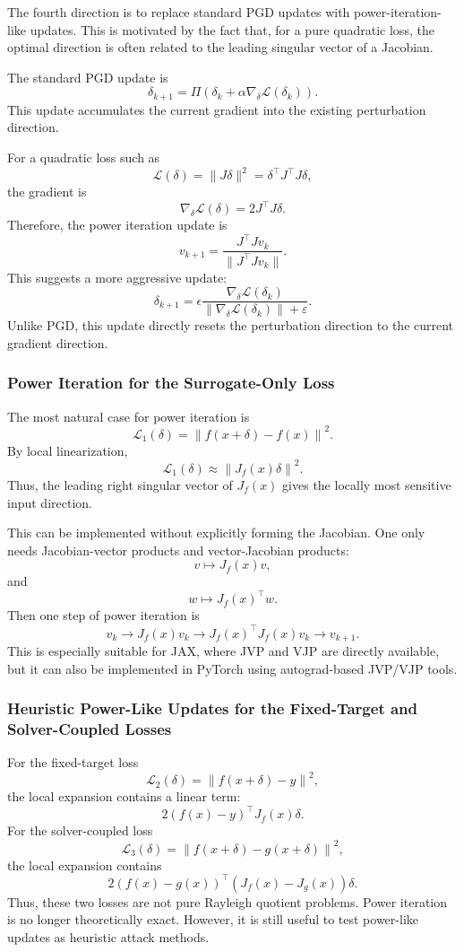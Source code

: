 \documentclass{article}
\begin{document}
The fourth direction is to replace standard PGD updates with power-iteration-like updates. This is motivated by the fact that, for a pure quadratic loss, the optimal direction is often related to the leading singular vector of a Jacobian.

The standard PGD update is
\[
\delta_{k+1}
=
\Pi
\left(
\delta_k
+
\alpha \nabla_\delta \mathcal{L}(\delta_k)
\right).
\]
This update accumulates the current gradient into the existing perturbation direction.

For a quadratic loss such as
\[
\mathcal{L}(\delta)
=
\|J\delta\|^2
=
\delta^\top J^\top J\delta,
\]
the gradient is
\[
\nabla_\delta \mathcal{L}(\delta)
=
2J^\top J\delta.
\]
Therefore, the power iteration update is
\[
v_{k+1}
=
\frac{
J^\top Jv_k
}{
\|J^\top Jv_k\|
}.
\]
This suggests a more aggressive update:
\[
\delta_{k+1}
=
\epsilon
\frac{
\nabla_\delta \mathcal{L}(\delta_k)
}{
\|\nabla_\delta \mathcal{L}(\delta_k)\|+\varepsilon
}.
\]
Unlike PGD, this update directly resets the perturbation direction to the current gradient direction.

\subsubsection{Power Iteration for the Surrogate-Only Loss}

The most natural case for power iteration is
\[
\mathcal{L}_1(\delta)
=
\left\|
f(x+\delta)-f(x)
\right\|^2.
\]
By local linearization,
\[
\mathcal{L}_1(\delta)
\approx
\left\|
J_f(x)\delta
\right\|^2.
\]
Thus, the leading right singular vector of \(J_f(x)\) gives the locally most sensitive input direction.

This can be implemented without explicitly forming the Jacobian. One only needs Jacobian-vector products and vector-Jacobian products:
\[
v
\mapsto
J_f(x)v,
\]
and
\[
w
\mapsto
J_f(x)^\top w.
\]
Then one step of power iteration is
\[
v_k
\rightarrow
J_f(x)v_k
\rightarrow
J_f(x)^\top J_f(x)v_k
\rightarrow
v_{k+1}.
\]
This is especially suitable for JAX, where JVP and VJP are directly available, but it can also be implemented in PyTorch using autograd-based JVP/VJP tools.

\subsubsection{Heuristic Power-Like Updates for the Fixed-Target and Solver-Coupled Losses}

For the fixed-target loss
\[
\mathcal{L}_2(\delta)
=
\left\|
f(x+\delta)-y
\right\|^2,
\]
the local expansion contains a linear term:
\[
2(f(x)-y)^\top J_f(x)\delta.
\]
For the solver-coupled loss
\[
\mathcal{L}_3(\delta)
=
\left\|
f(x+\delta)-g(x+\delta)
\right\|^2,
\]
the local expansion contains
\[
2(f(x)-g(x))^\top
\left(J_f(x)-J_g(x)\right)\delta.
\]
Thus, these two losses are not pure Rayleigh quotient problems. Power iteration is no longer theoretically exact. However, it is still useful to test power-like updates as heuristic attack methods.
\end{document}
